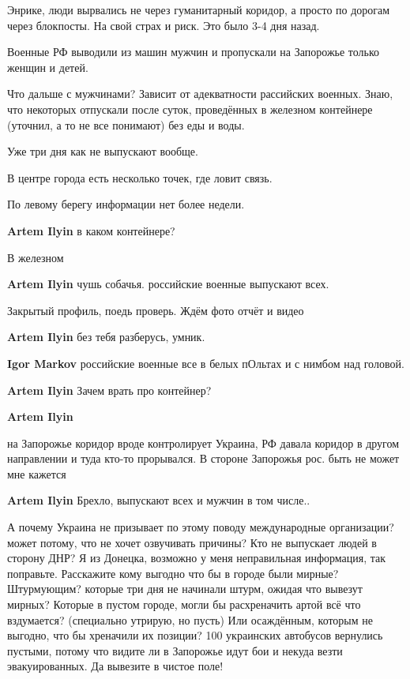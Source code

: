 \begin{itemize}
\begin{itemize}
\end{itemize} %


Энрике, люди вырвались не через гуманитарный коридор, а просто по дорогам через
блокпосты. На свой страх и риск. Это было 3-4 дня назад.

Военные РФ выводили из машин мужчин и пропускали на Запорожье только женщин и
детей.

Что дальше с мужчинами? Зависит от адекватности рассийских военных. Знаю, что
некоторых отпускали после суток, проведённых в железном контейнере (уточнил, а
то не все понимают) без еды и воды.

Уже три дня как не выпускают вообще.

В центре города есть несколько точек, где ловит связь.

По левому берегу информации нет более недели.

\begin{itemize} %
\textbf{Artem Ilyin} в каком контейнере?

В железном

\textbf{Artem Ilyin} чушь собачья. российские военные выпускают всех.

Закрытый профиль, поедь проверь. Ждём фото отчёт и видео

\textbf{Artem Ilyin} без тебя разберусь, умник.

\textbf{Igor Markov} российские военные все в белых пОльтах и с нимбом над головой.

\textbf{Artem Ilyin} Зачем врать про контейнер?

\textbf{Artem Ilyin} 

на Запорожье коридор вроде контролирует Украина, РФ давала коридор в другом
направлении и туда кто-то прорывался. В стороне Запорожья рос. быть не может
мне кажется

\textbf{Artem Ilyin}
Брехло, выпускают всех и мужчин в том числе..
\end{itemize} %


А почему Украина не призывает по этому поводу международные организации? может
потому, что не хочет озвучивать причины? Кто не выпускает людей в сторону ДНР?
Я из Донецка, возможно у меня неправильная информация, так поправьте.
Расскажите кому выгодно что бы в городе были мирные? Штурмующим? которые три дня
не начинали штурм, ожидая что вывезут мирных? Которые в пустом городе, могли бы
расхреначить артой всё что вздумается? (специально утрирую, но пусть) Или
осаждённым, которым не выгодно, что бы хреначили их позиции? 100 украинских
автобусов вернулись пустыми, потому что видите ли в Запорожье идут бои и некуда
везти эвакуированных. Да вывезите в чистое поле!


\end{itemize}
